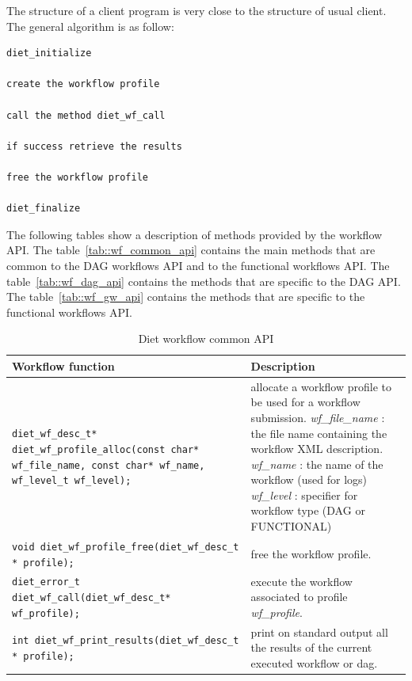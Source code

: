 \begin{itemize}
The structure of a client program is very close to the structure of
usual \diet client. The general algorithm is as follow:

\begin{verbatim}
diet_initialize

create the workflow profile

call the method diet_wf_call

if success retrieve the results

free the workflow profile

diet_finalize
\end{verbatim}

The following tables show a description of methods provided by the \diet workflow API.
The table~\ref{tab::wf_common_api} contains the main methods that are common to the DAG workflows API and to the functional workflows API.
The table~\ref{tab::wf_dag_api} contains the methods that are specific to the DAG API.
The table~\ref{tab::wf_gw_api} contains the methods that are specific to the functional workflows API.

\begin{table}[htbp]
  \centering
  \begin{tabular}[htbp]{|p{8cm}|p{7.5cm}|}\hline
    Workflow function & Description \\\hline
    \texttt{diet\_wf\_desc\_t*  \newline
      diet\_wf\_profile\_alloc(const char* wf\_file\_name, const char* wf\_name, wf\_level\_t wf\_level);}
    &
    allocate a workflow profile to be used for a workflow submission.\newline
    \textit{wf\_file\_name} : the file name containing the workflow XML description.
    \textit{wf\_name} : the name of the workflow (used for logs)
    \textit{wf\_level} : specifier for workflow type (DAG or FUNCTIONAL)
    \\\hline

    \texttt{void  \newline
      diet\_wf\_profile\_free(diet\_wf\_desc\_t * profile);}
    &
    free the workflow profile.
    \\\hline
    \texttt{diet\_error\_t \newline
      diet\_wf\_call(diet\_wf\_desc\_t* wf\_profile);}
    &
    execute the workflow associated to profile \textit{wf\_profile}.
    \\\hline
    \texttt{int \newline
      diet\_wf\_print\_results(diet\_wf\_desc\_t * profile);}
    &
    print on standard output all the results of the current executed workflow or dag.
    \\\hline
  \end{tabular}
  \caption{Diet workflow common API}
  \label{tab::wf_api}
\end{table}


\end{itemize}
